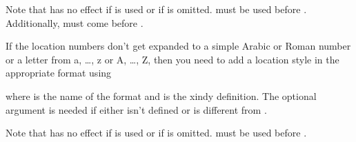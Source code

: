 \documentclass[report]{nlctdoc}
\begin{document}
\begin{important}
Note that  has no effect if  is
used or if  is omitted.
 must be used before .
Additionally,  must come before
.
\end{important}

If the location numbers don't get expanded to a simple Arabic or 
Roman number or a letter from a, \ldots, z or A, \ldots, Z, then
you need to add a location style in the appropriate format using
\begin{definition}[\DescribeMacro{\GlsAddXdyLocation}]
\end{definition}
where  is the name of the format and  is
the \gls{xindy} definition. The optional argument 
is needed if \linebreak{} either isn't defined or is
different from .

\begin{important}
Note that  has no effect if  is
used or if  is omitted.
 must be used before .
\end{important}
\end{document}
